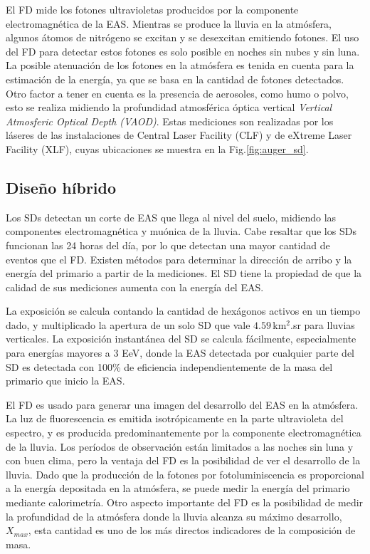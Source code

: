 El FD mide los fotones ultravioletas producidos por la componente electromagnética de la EAS. Mientras se produce la lluvia en la atmósfera, algunos átomos de nitrógeno se excitan y se desexcitan emitiendo fotones. El uso del FD para detectar estos fotones es solo posible en noches sin nubes y sin luna. La posible atenuación de los fotones en la atmósfera es tenida en cuenta para la estimación de la energía, ya que se basa en la cantidad de fotones detectados. Otro factor a tener en cuenta es la presencia de aerosoles, como humo o polvo, esto se realiza midiendo la profundidad atmosférica óptica vertical \emph{Vertical Atmosferic Optical Depth (VAOD)}. Estas mediciones son realizadas por los láseres de las instalaciones de Central Laser Facility (CLF) y de eXtreme Laser Facility (XLF), cuyas ubicaciones se muestra en la Fig.\ref{fig:auger_sd}.

\subsection{Diseño híbrido}\label{seccion:sd_eff}
Los SDs detectan un corte de EAS que llega al nivel del suelo, midiendo las componentes electromagnética y muónica de la lluvia. Cabe resaltar que los SDs funcionan las 24 horas del día, por lo que detectan una mayor cantidad de eventos que el FD. Existen métodos para determinar la dirección de arribo y la energía del primario a partir de la mediciones.  El SD tiene la propiedad de que la calidad de sus mediciones aumenta con la energía del EAS. 

La exposición se calcula contando la cantidad de hexágonos activos en un tiempo dado, y multiplicado la apertura de un solo SD que vale $4.59\,$km$^2$.sr para lluvias verticales. La exposición instantánea del SD se calcula fácilmente, especialmente para energías mayores a 3 EeV, donde la EAS detectada por cualquier parte del SD es detectada con 100\% de eficiencia independientemente de la masa del primario que inicio la EAS.

El FD es usado para generar una imagen del desarrollo del EAS en la atmósfera. La luz de fluorescencia es emitida isotrópicamente en la parte ultravioleta del espectro, y es producida predominantemente por la componente electromagnética de la lluvia. Los períodos de observación están limitados a las noches sin luna y con buen clima, pero la ventaja del FD es la posibilidad de ver el desarrollo de la lluvia. Dado que la producción de la fotones por fotoluminiscencia es proporcional a la energía depositada en la atmósfera, se puede medir la energía del primario mediante calorimetría. Otro aspecto importante del FD es la posibilidad de medir la profundidad de la atmósfera donde la lluvia alcanza su máximo desarrollo, $X_{max}$, esta cantidad es uno de los más directos indicadores de la composición de masa. \cite{data}

